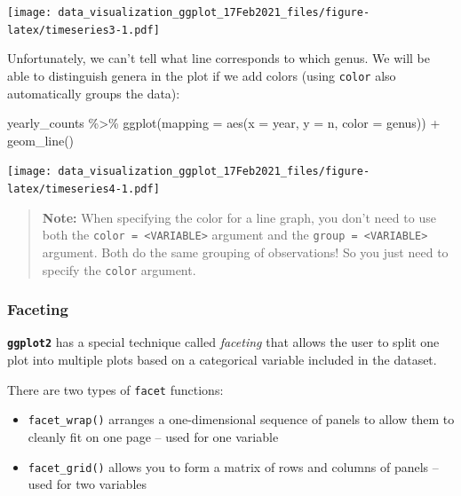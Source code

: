 \documentclass[
]{article}
\newenvironment{Shaded}{\begin{snugshade}}{\end{snugshade}}
\newcommand{\AttributeTok}[1]{\textcolor[rgb]{0.77,0.63,0.00}{#1}}
\newcommand{\FunctionTok}[1]{\textcolor[rgb]{0.00,0.00,0.00}{#1}}
\newcommand{\NormalTok}[1]{#1}
\newcommand{\SpecialCharTok}[1]{\textcolor[rgb]{0.00,0.00,0.00}{#1}}
\providecommand{\tightlist}{%
  \setlength{\itemsep}{0pt}\setlength{\parskip}{0pt}}
\begin{document}
\texttt{[image: data\_visualization\_ggplot\_17Feb2021\_files/figure-latex/timeseries3-1.pdf]}

Unfortunately, we can't tell what line corresponds to which genus. We
will be able to distinguish genera in the plot if we add colors (using
\texttt{color} also automatically groups the data):

\begin{Shaded}
\begin{Highlighting}[]
\NormalTok{yearly\_counts }\SpecialCharTok{\%\textgreater{}\%} 
\FunctionTok{ggplot}\NormalTok{(}\AttributeTok{mapping =} \FunctionTok{aes}\NormalTok{(}\AttributeTok{x =}\NormalTok{ year, }\AttributeTok{y =}\NormalTok{ n, }\AttributeTok{color =}\NormalTok{ genus)) }\SpecialCharTok{+}
    \FunctionTok{geom\_line}\NormalTok{()}
\end{Highlighting}
\end{Shaded}

\texttt{[image: data\_visualization\_ggplot\_17Feb2021\_files/figure-latex/timeseries4-1.pdf]}

\begin{quote}
\textbf{Note:} When specifying the color for a line graph, you don't
need to use both the
\texttt{color\ =\ \textless{}VARIABLE\textgreater{}} argument and the
\texttt{group\ =\ \textless{}VARIABLE\textgreater{}} argument. Both do
the same grouping of observations! So you just need to specify the
\texttt{color} argument.
\end{quote}

\hypertarget{faceting}{%
\subsubsection{Faceting}\label{faceting}}

\textbf{\texttt{ggplot2}} has a special technique called \emph{faceting}
that allows the user to split one plot into multiple plots based on a
categorical variable included in the dataset.

There are two types of \texttt{facet} functions:

\begin{itemize}
\tightlist
\item
  \texttt{facet\_wrap()} arranges a one-dimensional sequence of panels
  to allow them to cleanly fit on one page -- used for one variable
\item
  \texttt{facet\_grid()} allows you to form a matrix of rows and columns
  of panels -- used for two variables
\end{itemize}
\end{document}
